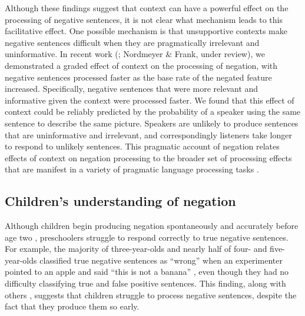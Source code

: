 \documentclass[man, noapacite]{apa2}
\begin{document}
Although these findings suggest that context can have a powerful effect on the processing of negative sentences, it is not clear what mechanism leads to this facilitative effect. One possible mechanism is that unsupportive contexts make negative sentences difficult when they are pragmatically irrelevant and uninformative. In recent work (; Nordmeyer \& Frank, under review), we demonstrated a graded effect of context on the processing of negation, with negative sentences processed faster as the base rate of the negated feature increased. Specifically, negative sentences that were more relevant and informative given the context were processed faster. We found that this effect of context could be reliably predicted by the probability of a speaker using the same sentence to describe the same picture. Speakers are unlikely to produce sentences that are uninformative and irrelevant, and correspondingly listeners take longer to respond to unlikely sentences. This pragmatic account of negation relates effects of context on negation processing to the broader set of processing effects that are manifest in a variety of pragmatic language processing tasks \cite{goodman2016}.

\subsection{Children's understanding of negation}

Although children begin producing negation spontaneously and accurately before age two \cite{bloom1970, pea1980, pea1982}, preschoolers struggle to respond correctly to true negative sentences. For example, the majority of three-year-olds and nearly half of four- and five-year-olds classified true negative sentences as ``wrong'' when an experimenter pointed to an apple and said ``this is not a banana'' \cite{kim1985}, even though they had no difficulty classifying true and false positive sentences. This finding, along with others \cite{gilkerson2002, loder2006, nordmeyer2014b}, suggests that children struggle to process negative sentences, despite the fact that they produce them so early.
\end{document}
